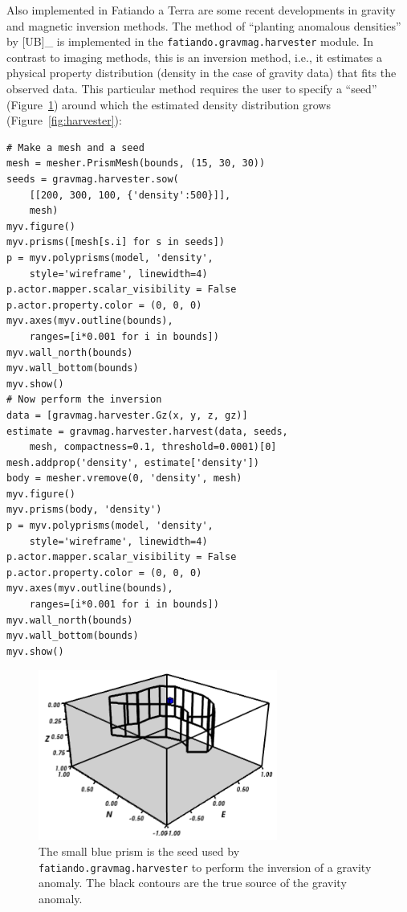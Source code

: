 Also implemented in Fatiando a Terra are some recent developments in
gravity and magnetic inversion methods. The method of ``planting
anomalous densities'' by {[}UB{]}\_ is implemented in the
\texttt{fatiando.gravmag.harvester} module. In contrast to imaging
methods, this is an inversion method, i.e., it estimates a physical
property distribution (density in the case of gravity data) that fits
the observed data. This particular method requires the user to specify a
``seed'' (Figure~\ref{fig:seed}) around which the estimated density
distribution grows (Figure~\ref{fig:harvester}):

\begin{verbatim}
# Make a mesh and a seed
mesh = mesher.PrismMesh(bounds, (15, 30, 30))
seeds = gravmag.harvester.sow(
    [[200, 300, 100, {'density':500}]],
    mesh)
myv.figure()
myv.prisms([mesh[s.i] for s in seeds])
p = myv.polyprisms(model, 'density',
    style='wireframe', linewidth=4)
p.actor.mapper.scalar_visibility = False
p.actor.property.color = (0, 0, 0)
myv.axes(myv.outline(bounds),
    ranges=[i*0.001 for i in bounds])
myv.wall_north(bounds)
myv.wall_bottom(bounds)
myv.show()
# Now perform the inversion
data = [gravmag.harvester.Gz(x, y, z, gz)]
estimate = gravmag.harvester.harvest(data, seeds,
    mesh, compactness=0.1, threshold=0.0001)[0]
mesh.addprop('density', estimate['density'])
body = mesher.vremove(0, 'density', mesh)
myv.figure()
myv.prisms(body, 'density')
p = myv.polyprisms(model, 'density',
    style='wireframe', linewidth=4)
p.actor.mapper.scalar_visibility = False
p.actor.property.color = (0, 0, 0)
myv.axes(myv.outline(bounds),
    ranges=[i*0.001 for i in bounds])
myv.wall_north(bounds)
myv.wall_bottom(bounds)
myv.show()
\end{verbatim}

\begin{figure}
    \centering
    \includegraphics[width=0.7\textwidth]{figures/paper1/gravmag_harvester_seed}
    \caption{
        The small blue prism is the seed used by
        \texttt{fatiando.gravmag.harvester} to perform the inversion of a
        gravity anomaly. The black contours are the true source of the gravity
        anomaly.
    }
    \label{fig:seed}
\end{figure}

